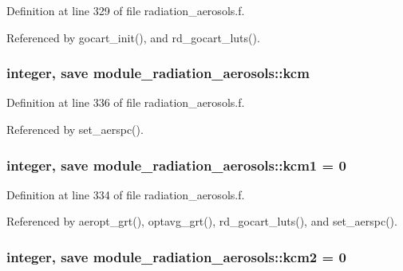 Definition at line 329 of file radiation\+\_\+aerosols.\+f.



Referenced by gocart\+\_\+init(), and rd\+\_\+gocart\+\_\+luts().

\subsubsection[{\texorpdfstring{kcm}{kcm}}]{\setlength{\rightskip}{0pt plus 5cm}integer, save module\+\_\+radiation\+\_\+aerosols\+::kcm\hspace{0.3cm}{\ttfamily [private]}}\hypertarget{group__module__radiation__aerosols_ga4816bc93b826ff2fad9ff0805ea39fd5}{}\label{group__module__radiation__aerosols_ga4816bc93b826ff2fad9ff0805ea39fd5}


Definition at line 336 of file radiation\+\_\+aerosols.\+f.



Referenced by set\+\_\+aerspc().

\subsubsection[{\texorpdfstring{kcm1}{kcm1}}]{\setlength{\rightskip}{0pt plus 5cm}integer, save module\+\_\+radiation\+\_\+aerosols\+::kcm1 = 0\hspace{0.3cm}{\ttfamily [private]}}\hypertarget{group__module__radiation__aerosols_ga92b09dd26cc321af3b5da0b1c310a588}{}\label{group__module__radiation__aerosols_ga92b09dd26cc321af3b5da0b1c310a588}


Definition at line 334 of file radiation\+\_\+aerosols.\+f.



Referenced by aeropt\+\_\+grt(), optavg\+\_\+grt(), rd\+\_\+gocart\+\_\+luts(), and set\+\_\+aerspc().

\subsubsection[{\texorpdfstring{kcm2}{kcm2}}]{\setlength{\rightskip}{0pt plus 5cm}integer, save module\+\_\+radiation\+\_\+aerosols\+::kcm2 = 0\hspace{0.3cm}{\ttfamily [private]}}\hypertarget{group__module__radiation__aerosols_gab2be28697a95bcec8d5cd8de7ebd4328}{}\label{group__module__radiation__aerosols_gab2be28697a95bcec8d5cd8de7ebd4328}


